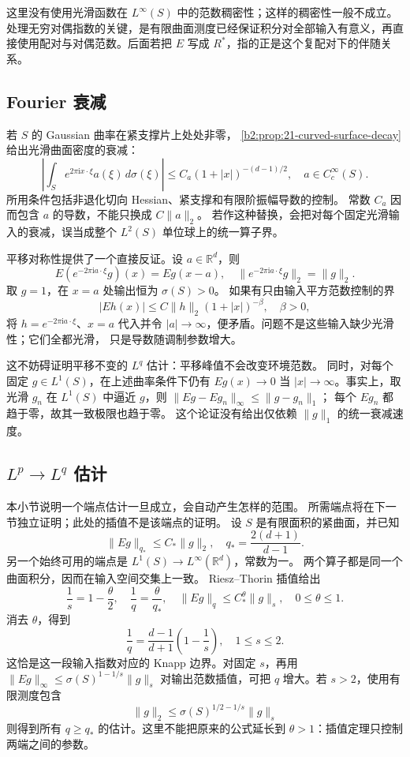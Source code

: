这里没有使用光滑函数在 \(L^\infty(S)\) 中的范数稠密性；这样的稠密性一般不成立。处理无穷对偶指数的关键，是有限曲面测度已经保证积分对全部输入有意义，再直接使用配对与对偶范数。后面若把 \(E\) 写成 \(R^*\)，指的正是这个复配对下的伴随关系。

\subsection{Fourier 衰减}
\label{b2:subsec:230302}

若 \(S\) 的 Gaussian 曲率在紧支撑片上处处非零，
\cref{b2:prop:21-curved-surface-decay}给出光滑曲面密度的衰减：
\[
 \left|\int_S e^{2\pi\mathrm i x\cdot\xi}a(\xi)\,d\sigma(\xi)\right|
       \leq C_a(1+|x|)^{-(d-1)/2},
 \quad a\in C_c^\infty(S).
\]
所用条件包括非退化切向 Hessian、紧支撑和有限阶振幅导数的控制。
常数 \(C_a\) 因而包含 \(a\) 的导数，不能只换成 \(C\|a\|_2\)。
若作这种替换，会把对每个固定光滑输入的衰减，误当成整个
\(L^2(S)\) 单位球上的统一算子界。

\ProseParagraphBreak
平移对称性提供了一个直接反证。设 \(a\in\mathbb R^d\)，则
\[
 E(e^{-2\pi\mathrm i a\cdot\xi}g)(x)=Eg(x-a),
 \quad
 \|e^{-2\pi\mathrm i a\cdot\xi}g\|_2=\|g\|_2.
\]
取 \(g=1\)，在 \(x=a\) 处输出恒为 \(\sigma(S)>0\)。
如果有只由输入平方范数控制的界
\[
 |Eh(x)|\leq C\|h\|_2(1+|x|)^{-\beta},
 \quad \beta>0,
\]
将 \(h=e^{-2\pi\mathrm i a\cdot\xi}\)、\(x=a\) 代入并令
\(|a|\to\infty\)，便矛盾。问题不是这些输入缺少光滑性；它们全都光滑，
只是导数随调制参数增大。

\ProseParagraphBreak
这不妨碍证明平移不变的 \(L^q\) 估计：平移峰值不会改变环境范数。
同时，对每个固定 \(g\in L^1(S)\)，在上述曲率条件下仍有
\(Eg(x)\to0\) 当 \(|x|\to\infty\)。事实上，取光滑 \(g_n\) 在
\(L^1(S)\) 中逼近 \(g\)，则
\(\|Eg-Eg_n\|_\infty\leq\|g-g_n\|_1\)；
每个 \(Eg_n\) 都趋于零，故其一致极限也趋于零。
这个论证没有给出仅依赖 \(\|g\|_1\) 的统一衰减速度。

\subsection{\texorpdfstring{\(L^p\to L^q\)}{Lp→Lq} 估计}
\label{b2:subsec:230303}

本小节说明一个端点估计一旦成立，会自动产生怎样的范围。
所需端点将在下一节独立证明；此处的插值不是该端点的证明。
设 \(S\) 是有限面积的紧曲面，并已知
\[
 \|Eg\|_{q_*}\leq C_*\|g\|_2,\quad
 q_*=\frac{2(d+1)}{d-1}.
\]
另一个始终可用的端点是 \(L^1(S)\to L^\infty(\mathbb R^d)\)，常数为一。
两个算子都是同一个曲面积分，因而在输入空间交集上一致。
Riesz--Thorin 插值给出
\[
 \frac1s=1-\frac\theta2,\quad
 \frac1q=\frac\theta{q_*},\quad
 \|Eg\|_q\leq C_*^\theta\|g\|_s,
 \quad 0\leq\theta\leq1.
\]
消去 \(\theta\)，得到
\[
 \frac1q=\frac{d-1}{d+1}\left(1-\frac1s\right),
 \quad 1\leq s\leq2.
\]
这恰是这一段输入指数对应的 Knapp 边界。对固定 \(s\)，再用
\(\|Eg\|_\infty\leq\sigma(S)^{1-1/s}\|g\|_s\)
对输出范数插值，可把 \(q\) 增大。若 \(s>2\)，使用有限测度包含
\[
 \|g\|_2\leq\sigma(S)^{1/2-1/s}\|g\|_s
\]
则得到所有 \(q\geq q_*\) 的估计。这里不能把原来的公式延长到
\(\theta>1\)：插值定理只控制两端之间的参数。

